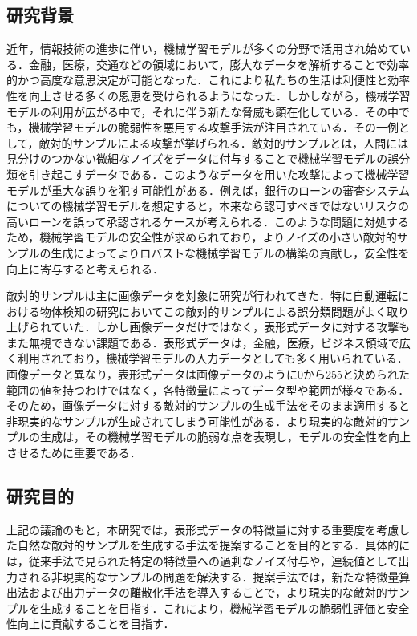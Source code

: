 \subsection{研究背景}
近年，情報技術の進歩に伴い，機械学習モデルが多くの分野で活用され始めている．金融，医療，交通などの領域において，膨大なデータを解析することで効率的かつ高度な意思決定が可能となった．これにより私たちの生活は利便性と効率性を向上させる多くの恩恵を受けられるようになった．しかしながら，機械学習モデルの利用が広がる中で，それに伴う新たな脅威も顕在化している．その中でも，機械学習モデルの脆弱性を悪用する攻撃手法が注目されている．その一例として，敵対的サンプルによる攻撃が挙げられる．敵対的サンプルとは，人間には見分けのつかない微細なノイズをデータに付与することで機械学習モデルの誤分類を引き起こすデータである．このようなデータを用いた攻撃によって機械学習モデルが重大な誤りを犯す可能性がある．例えば，銀行のローンの審査システムについての機械学習モデルを想定すると，本来なら認可すべきではないリスクの高いローンを誤って承認されるケースが考えられる．このような問題に対処するため，機械学習モデルの安全性が求められており，よりノイズの小さい敵対的サンプルの生成によってよりロバストな機械学習モデルの構築の貢献し，安全性を向上に寄与すると考えられる．

敵対的サンプルは主に画像データを対象に研究が行われてきた．特に自動運転における物体検知の研究においてこの敵対的サンプルによる誤分類問題がよく取り上げられていた．しかし画像データだけではなく，表形式データに対する攻撃もまた無視できない課題である．表形式データは，金融，医療，ビジネス領域で広く利用されており，機械学習モデルの入力データとしても多く用いられている．画像データと異なり，表形式データは画像データのように0から255と決められた範囲の値を持つわけではなく，各特徴量によってデータ型や範囲が様々である．そのため，画像データに対する敵対的サンプルの生成手法をそのまま適用すると非現実的なサンプルが生成されてしまう可能性がある．より現実的な敵対的サンプルの生成は，その機械学習モデルの脆弱な点を表現し，モデルの安全性を向上させるために重要である．

\subsection{研究目的}
上記の議論のもと，本研究では，表形式データの特徴量に対する重要度を考慮した自然な敵対的サンプルを生成する手法を提案することを目的とする．具体的には，従来手法で見られた特定の特徴量への過剰なノイズ付与や，連続値として出力される非現実的なサンプルの問題を解決する．提案手法では，新たな特徴量算出法および出力データの離散化手法を導入することで，より現実的な敵対的サンプルを生成することを目指す．これにより，機械学習モデルの脆弱性評価と安全性向上に貢献することを目指す．